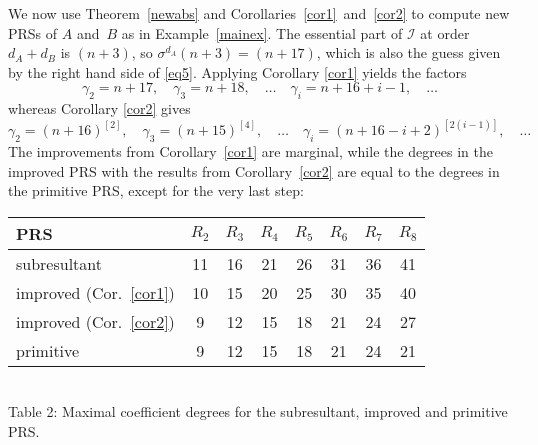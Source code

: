 \documentclass[3p,11pt,preprint]{elsarticle}
\begin{document}
\begin{example}
 We now use Theorem~\ref{newabs} and Corollaries~\ref{cor1}~and~\ref{cor2} to compute new PRSs of $A$ and~$B$ as in Example~\ref{mainex}. The essential part of $\mathcal{I}$ at order~$d_A+d_B$ is $(n+3)$, so $\sigma^{d_A}(n+3) = (n+17)$, which is also the guess given by the right hand side of \eqref{eq5}. Applying Corollary \ref{cor1} yields the factors
\[\gamma_2 = n+17,\quad \gamma_3 = n+18,\quad\dots\quad \gamma_i = n+16+i-1,\quad\dots\]
whereas Corollary \ref{cor2} gives
\[\gamma_2 = (n + 16)^{[2]},\quad \gamma_3 = (n + 15)^{[4]},\quad \dots\quad \gamma_i = (n+16-i+2)^{[2(i-1)]},\quad\dots\]
 The improvements from Corollary~\ref{cor1}  are marginal, while the degrees in the improved PRS with the results from Corollary~\ref{cor2} are equal to the degrees in the primitive PRS, except for the very last step:
 \begin{center}
\begin{tabular}{l|c|c|c|c|c|c|c}
PRS & $R_2$ & $R_3$ & $R_4$ & $R_5$ & $R_6$ & $R_7$ & $R_8$\\
\hline
 subresultant & 11 & 16 & 21 & 26 & 31 & 36 & 41\\
\hline
 improved (Cor.~\ref{cor1}) & 10 & 15 & 20 & 25 & 30 & 35 & 40\\
\hline
 improved (Cor.~\ref{cor2})& 9 & 12 & 15 & 18 & 21 & 24 & 27\\
\hline
 primitive & 9 & 12 & 15 & 18 & 21 & 24 & 21\\
\end{tabular}\\
\vspace{0.1cm}\scriptsize{Table 2: Maximal coefficient degrees for the subresultant, improved and primitive PRS.}
\end{center}
\end{example}
\end{document}

